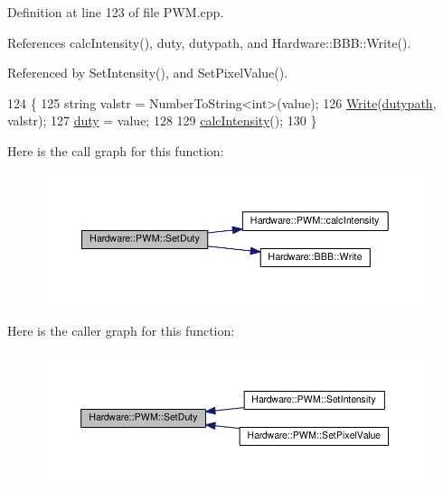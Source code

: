 Definition at line 123 of file P\+W\+M.\+cpp.



References calc\+Intensity(), duty, dutypath, and Hardware\+::\+B\+B\+B\+::\+Write().



Referenced by Set\+Intensity(), and Set\+Pixel\+Value().


\begin{DoxyCode}
124     \{
125         \textcolor{keywordtype}{string} valstr = NumberToString<int>(value);
126         \hyperlink{class_hardware_1_1_b_b_b_a155cc06f76d82a6b690ce5ea08e7c68e}{Write}(\hyperlink{class_hardware_1_1_p_w_m_a53311e9df6960751465d5f0b81192226}{dutypath}, valstr);
127         \hyperlink{class_hardware_1_1_p_w_m_a3309b2645c4c817384d91f33f0df5d64}{duty} = value;
128 
129         \hyperlink{class_hardware_1_1_p_w_m_a891abdbbd00aae4f0a4afdf0a9e3a160}{calcIntensity}();
130     \}
\end{DoxyCode}


Here is the call graph for this function\+:\nopagebreak
\begin{figure}[H]
\begin{center}
\leavevmode
\includegraphics[width=350pt]{class_hardware_1_1_p_w_m_a93ea3627da17bf143ac548cbd623d13d_cgraph}
\end{center}
\end{figure}




Here is the caller graph for this function\+:\nopagebreak
\begin{figure}[H]
\begin{center}
\leavevmode
\includegraphics[width=350pt]{class_hardware_1_1_p_w_m_a93ea3627da17bf143ac548cbd623d13d_icgraph}
\end{center}
\end{figure}


